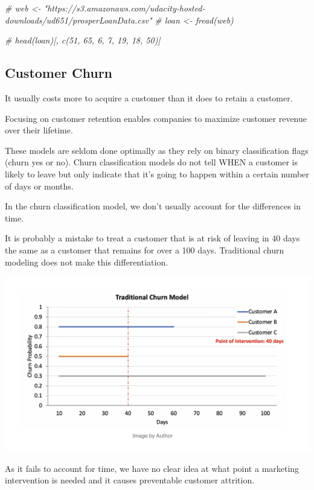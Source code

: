 \documentclass[
]{book}
\newenvironment{Shaded}{\begin{snugshade}}{\end{snugshade}}
\newcommand{\CommentTok}[1]{\textcolor[rgb]{0.56,0.35,0.01}{\textit{#1}}}
\begin{document}
\begin{Shaded}
\begin{Highlighting}[]
\CommentTok{\# web \textless{}{-} "https://s3.amazonaws.com/udacity{-}hosted{-}downloads/ud651/prosperLoanData.csv"}
\CommentTok{\# loan \textless{}{-} fread(web)}

\CommentTok{\# head(loan)[, c(51, 65, 6, 7, 19, 18, 50)]}
\end{Highlighting}
\end{Shaded}

\hypertarget{customer-churn}{%
\subsection{Customer Churn}\label{customer-churn}}

It usually costs more to acquire a customer than it does to retain a customer.

Focusing on customer retention enables companies to maximize customer revenue over their lifetime.

These models are seldom done optimally as they rely on binary classification flags (churn yes or no). Churn classification models do not tell WHEN a customer is likely to leave but only indicate that it's going to happen within a certain number of days or months.

In the churn classification model, we don't usually account for the differences in time.

It is probably a mistake to treat a customer that is at risk of leaving in 40 days the same as a customer that remains for over a 100 days. Traditional churn modeling does not make this differentiation.

\includegraphics{figs/churn1.png}

As it fails to account for time, we have no clear idea at what point a marketing intervention is needed and it causes preventable customer attrition.
\end{document}

